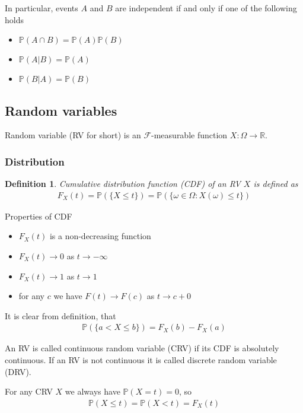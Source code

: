 \documentclass[10pt]{article}
\newtheorem*{definition}{Definition}
\begin{document}
In particular, events $A$ and $B$ are independent if and only if one of the
following holds
\begin{itemize}
    \item $\mathbb{P}(A\cap B)=\mathbb{P}(A)\mathbb{P}(B)$
    \item $\mathbb{P}(A|B)=\mathbb{P}(A)$
    \item $\mathbb{P}(B|A)=\mathbb{P}(B)$
\end{itemize}



\subsection{Random variables}

Random variable (RV for short) is an $\mathcal{F}$-measurable function
$X:\Omega\to\mathbb{R}$.

\subsubsection{Distribution}

\begin{definition} Cumulative distribution function (CDF) of an RV $X$ is
    defined as
    \begin{align}
        F_X(t)=\mathbb{P}(\{X\leq t\})
        =\mathbb{P}(\{\omega\in\Omega:X(\omega)\leq t\})
    \end{align}
\end{definition}

Properties of CDF

\begin{itemize}
    \item $F_X(t)$ is a non-decreasing function
    \item $F_X(t)\to 0$ as $t\to-\infty$
    \item $F_X(t)\to 1$ as $t\to 1$
    \item for any $c$ we have $F(t)\to F(c)$ as $t\to c+0$
\end{itemize}

It is clear from definition, that
\begin{align}
    \mathbb{P}(\{a< X\leq b\})=F_X(b)-F_X(a)
\end{align}

An RV is called continuous random variable (CRV) if its CDF is absolutely
continuous. If an RV is not continuous it is called discrete random variable
(DRV).

For any CRV $X$ we always have $\mathbb{P}(X=t)=0$, so
\begin{align}
    \mathbb{P}(X\leq t)=\mathbb{P}(X<t)=F_X(t)
\end{align}
\end{document}
